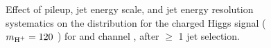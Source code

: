 \begin{figure}
    \caption{ Effect of pileup, jet energy scale, and jet energy resolution systematics on the \mjj 
	distribution for the charged Higgs signal ($m_{\text{H}^+} = 120$ \GeV) for \mujets and \ejets channel
	, after $\geq$ 1 \PQc jet selection.}
    \label{fig:sys_effect_wh1}
\end{figure}

